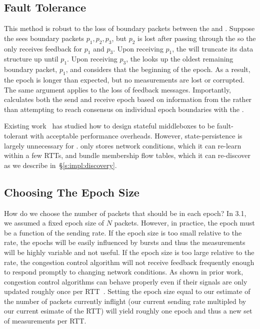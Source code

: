 \subsection{Fault Tolerance}
\label{s:measure:loss}
 This method is robust to the loss of boundary packets between the \inbox and \outbox.
Suppose the \inbox sees boundary packets $p_1, p_2, p_3$, but $p_2$ is lost after passing through
the \inbox so the \inbox only receives feedback for $p_1$ and $p_3$. Upon receiving $p_1$, 
the \inbox will truncate its data structure up until $p_1$. Upon receiving $p_3$, the \inbox 
looks up the oldest remaining boundary packet, $p_1$, and considers that the beginning of the epoch.
As a result, the epoch is longer than expected, but no measurements are lost or corrupted. 
The same argument applies to the loss of feedback messages. 
Importantly, \inbox calculates both the send and receive epoch based on information
from the \outbox rather than attempting to reach consensus on individual epoch boundaries with the \outbox. 

 Existing work~\cite{ftmb} has studied how to design stateful middleboxes to be fault-tolerant with acceptable performance overheads. 
However, state-persistence is largely unnecessary for \name.
\name only stores network conditions, which it can re-learn within a few RTTs, and bundle membership flow tables, which it can re-discover as we describe in~\S\ref{s:impl:discovery}. 

\subsection{Choosing The Epoch Size}
\label{s:measure:epoch}
How do we choose the number of packets that should be in each epoch?
In 3.1, we assumed a fixed epoch size of $N$ packets.
However, in practice, the epoch must be a function of the sending rate.
If the epoch size is too small relative to the rate,
the epochs will be easily influenced by bursts and thus the measurements will be highly variable
and not useful.
If the epoch size is too large relative to the rate, the congestion control algorithm will not
receive feedback frequently enough to respond promptly to changing network conditions. 
As shown in prior work, congestion control algorithms can behave properly even if their
signals are only updated roughly once per RTT~\cite{ccp-hotnets}.
Setting the epoch size equal to our estimate of the number of packets currently inflight 
(our current sending rate multipled by our current esimate of the RTT) will yield roughly
one epoch and thus a new set of measurements per RTT.

